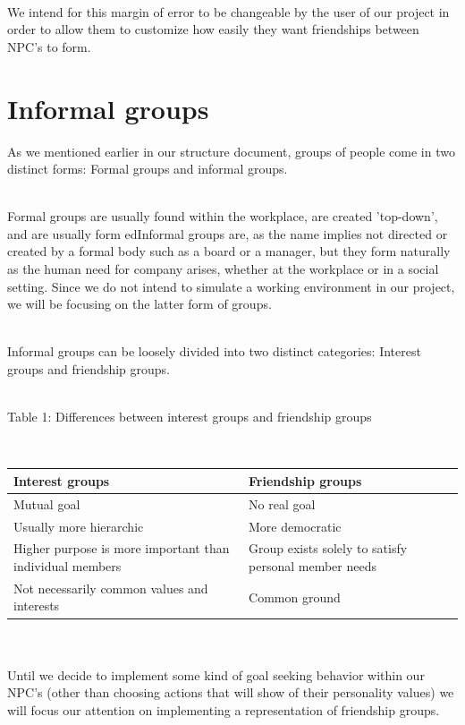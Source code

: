 \documentclass[11pt]{article} %
\begin{document}
~\\
We intend for this margin of error to be changeable by the user of our project in order to allow them to customize how easily they want friendships between NPC's to form.

\newpage
\section{Informal groups}
As we mentioned earlier in our structure document, groups of people come in two distinct forms: Formal groups and informal groups.

~\\
Formal groups are usually found within the workplace, are created 'top-down', and are usually form edInformal groups are, as the name implies not directed or created by a formal body such as a board or a manager, but they form naturally as the human need for company arises, whether at the workplace or in a social setting. Since we do not intend to simulate a working environment in our project, we will be focusing on the latter form of groups. 

~\\
Informal groups can be loosely divided into two distinct categories: Interest groups and friendship groups.

~\\
Table 1: Differences between interest groups and friendship groups

~\\ 
\begin{tabularx}{0.7\textwidth}{ |X|X| }\hline
\textbf{Interest groups} & \textbf{Friendship groups} \\ \hline
Mutual goal & No real goal \\ \hline
Usually more hierarchic & More democratic \\ \hline
Higher purpose is more important than individual members & Group exists solely to satisfy personal member needs \\ \hline
Not necessarily common values and interests & Common ground \\ \hline
\end{tabularx}
~\\

~\\
Until we decide to implement some kind of goal seeking behavior within our NPC's (other than choosing actions that will show of their personality values) we will focus our attention on implementing a representation of friendship groups.  
\end{document}
